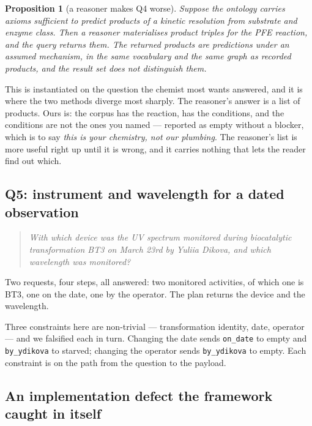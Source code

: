 \documentclass[11pt,a4paper]{article}
\theoremstyle{plain}
\newtheorem{proposition}[theorem]{Proposition}
\theoremstyle{definition}
\theoremstyle{remark}
\newcommand{\vans}{\textsf{answered}}
\newcommand{\vempty}{\textsf{empty}}
\newcommand{\vstarve}{\textsf{starved}}
\begin{document}
\begin{proposition}[a reasoner makes Q4 worse]
\label{prop:q4worse}
Suppose the ontology carries axioms sufficient to predict products of a
kinetic resolution from substrate and enzyme class. Then a reasoner
materialises product triples for the PFE reaction, and the query
returns them. The returned products are predictions under an assumed
mechanism, in the same vocabulary and the same graph as recorded
products, and the result set does not distinguish them.
\end{proposition}

This is  instantiated on the question the chemist
most wants answered, and it is where the two methods diverge most
sharply. The reasoner's answer is a list of products. Ours is: the
corpus has the reaction, has the conditions, and the conditions are not
the ones you named --- reported as \vempty{} without a blocker, which
is to say \emph{this is your chemistry, not our plumbing}. The
reasoner's list is more useful right up until it is wrong, and it
carries nothing that lets the reader find out which.

\subsection{Q5: instrument and wavelength for a dated observation}
\label{sec:q5}

\begin{quote}
\emph{With which device was the UV spectrum monitored during
biocatalytic transformation BT3 on March 23rd by Yuliia Dikova, and
which wavelength was monitored?}
\end{quote}

Two requests, four steps, all \vans: two monitored activities, of which
one is BT3, one on the date, one by the operator. The plan returns the
device and the wavelength.

Three constraints here are non-trivial --- transformation identity,
date, operator --- and we falsified each in turn. Changing the date
sends \texttt{on\_date} to \vempty{} and \texttt{by\_ydikova} to
\vstarve{}; changing the operator sends \texttt{by\_ydikova} to
\vempty{}. Each constraint is on the path from the question to the
payload.

\subsection{An implementation defect the framework caught in itself}
\label{sec:selfcatch}
\end{document}
